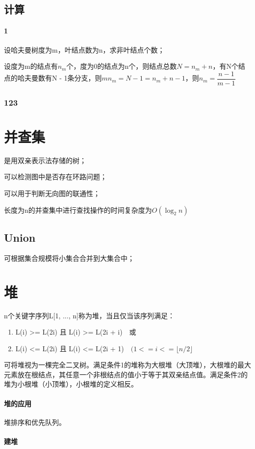 \subsection{计算}

\paragraph{1}
设哈夫曼树度为m，叶结点数为n，求非叶结点个数；

设度为m的结点有\(n_m\)个，度为0的结点为n个，则结点总数\(N = n_m + n\)，有N个结点的哈夫曼数有N - 1条分支，则\(mn_m = N - 1 = n_m + n - 1\)，则\(n_m = \dfrac{n - 1}{m - 1}\)


\subsubsection{123}


\section{并查集}

是用双亲表示法存储的树；

可以检测图中是否存在环路问题；

可以用于判断无向图的联通性；

长度为n的并查集中进行查找操作的时间复杂度为\(O(\log_2n)\)

\subsection{Union}

可根据集合规模将小集合合并到大集合中；


\section{堆}\label{堆}
n个关键字序列L[1, ..., n]称为堆，当且仅当该序列满足：
\begin{enumerate}
    \item L(i) >= L(2i) 且 L(i) >= L(2i + i)\ \ 或
    \item L(i) <= L(2i) 且 L(i) <= L(2i + 1)\ \ \((1 <= i <= \lfloor n / 2\rfloor\)
\end{enumerate}

可将堆视为一棵完全二叉树。满足条件1的堆称为大根堆（大顶堆），大根堆的最大元素放在根结点，其任意一个非根结点的值小于等于其双亲结点值。满足条件2的堆为小根堆（小顶堆），小根堆的定义相反。

\paragraph{堆的应用}
堆排序和优先队列。

\paragraph{建堆}




